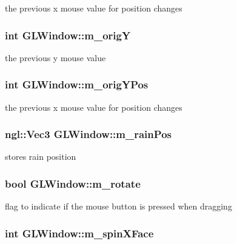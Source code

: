 the previous x mouse value for position changes \hypertarget{classGLWindow_ab7a1ee2202588e005b90c99ea1323af4}{
\subsubsection[{m\_\-origY}]{\setlength{\rightskip}{0pt plus 5cm}int {\bf GLWindow::m\_\-origY}}}
\label{classGLWindow_ab7a1ee2202588e005b90c99ea1323af4}


the previous y mouse value \hypertarget{classGLWindow_aab805b77275ea41e8ff2dcf9e714f345}{
\subsubsection[{m\_\-origYPos}]{\setlength{\rightskip}{0pt plus 5cm}int {\bf GLWindow::m\_\-origYPos}}}
\label{classGLWindow_aab805b77275ea41e8ff2dcf9e714f345}


the previous x mouse value for position changes \hypertarget{classGLWindow_a91cc1b7f7a3ecf1781d76dd0c3d16609}{
\subsubsection[{m\_\-rainPos}]{\setlength{\rightskip}{0pt plus 5cm}ngl::Vec3 {\bf GLWindow::m\_\-rainPos}}}
\label{classGLWindow_a91cc1b7f7a3ecf1781d76dd0c3d16609}


stores rain position \hypertarget{classGLWindow_a1b5d8b223995bc9740074c5342fe8e38}{
\subsubsection[{m\_\-rotate}]{\setlength{\rightskip}{0pt plus 5cm}bool {\bf GLWindow::m\_\-rotate}}}
\label{classGLWindow_a1b5d8b223995bc9740074c5342fe8e38}


flag to indicate if the mouse button is pressed when dragging \hypertarget{classGLWindow_af8ea09020a5ad4c20a16ea835ed1f2af}{
\subsubsection[{m\_\-spinXFace}]{\setlength{\rightskip}{0pt plus 5cm}int {\bf GLWindow::m\_\-spinXFace}}}
\label{classGLWindow_af8ea09020a5ad4c20a16ea835ed1f2af}


